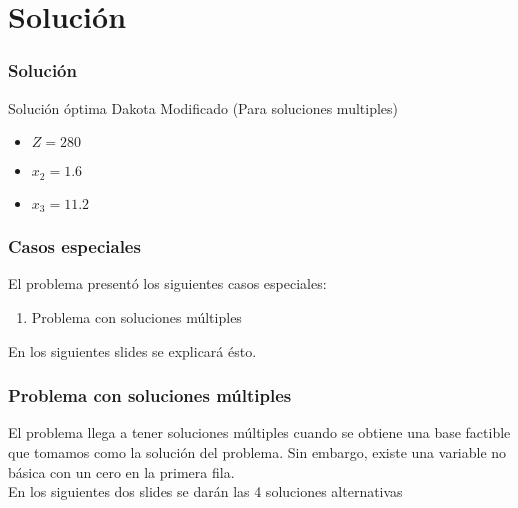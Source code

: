 \documentclass{beamer}
\begin{document}
\section{Solución} 
\begin{frame} 
\frametitle{Solución} 
\begin{exampleblock}{Solución óptima} 
{\scriptsize Dakota Modificado (Para soluciones multiples)} 
\begin{itemize} 
\item $Z = 280$ 
\item $x_{2} = 1.6$ 
\item $x_{3} = 11.2$ 
\end{itemize} 
\end{exampleblock} 
\end{frame} 


\begin{frame} 
\frametitle{Casos especiales} 
\begin{exampleblock}{} 
El problema presentó los siguientes casos especiales: 
\begin{enumerate} 
\item Problema con soluciones múltiples  
\end{enumerate} 
\end{exampleblock} 
En los siguientes slides se explicará ésto. 
\end{frame} 


\begin{frame} 
\frametitle{Problema con soluciones múltiples} 
El problema llega a tener soluciones múltiples cuando se obtiene una base factible que tomamos como la solución del problema. Sin embargo, existe una variable no básica con un cero en la primera fila. \\ 

En los siguientes dos slides se darán las 4 soluciones alternativas 
\end{frame} 
\end{document}
